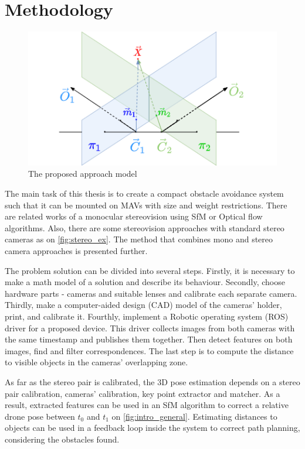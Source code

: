 \chapter{Methodology}

\label{chapter:methodology}

\begin{figure}[h]
    \centering
    \includegraphics[width=.8\textwidth]{graphics/td90deg.png}
    \caption{The proposed approach model}
    \label{fig:td90deg}
\end{figure}

The main task of this thesis is to create a compact obstacle avoidance system such that it can be mounted on MAVs with size and weight restrictions.
There are related works of a monocular stereovision using SfM or Optical flow algorithms. 
Also, there are some stereovision approaches with standard stereo cameras as on \autoref{fig:stereo_ex}.
The method that combines mono and stereo camera approaches is presented further.

The problem solution can be divided into several steps. 
Firstly, it is necessary to make a math model of a solution and describe its behaviour. 
Secondly, choose hardware parts - cameras and suitable lenses and calibrate each separate camera. 
Thirdly, make a computer-aided design (CAD) model of the cameras' holder, print, and calibrate it.
Fourthly, implement a Robotic operating system (ROS) driver for a proposed device. 
This driver collects images from both cameras with the same timestamp and publishes them together.
Then detect features on both images, find and filter correspondences.
The last step is to compute the distance to visible objects in the cameras' overlapping zone.

As far as the stereo pair is calibrated, the 3D pose estimation depends on a stereo pair calibration, cameras' calibration, key point extractor and matcher.
As a result, extracted features can be used in an SfM algorithm to correct a relative drone pose between $t_0$ and $t_1$ on \autoref{fig:intro_general}.
Estimating distances to objects can be used in a feedback loop inside the system to correct path planning, considering the obstacles found.

